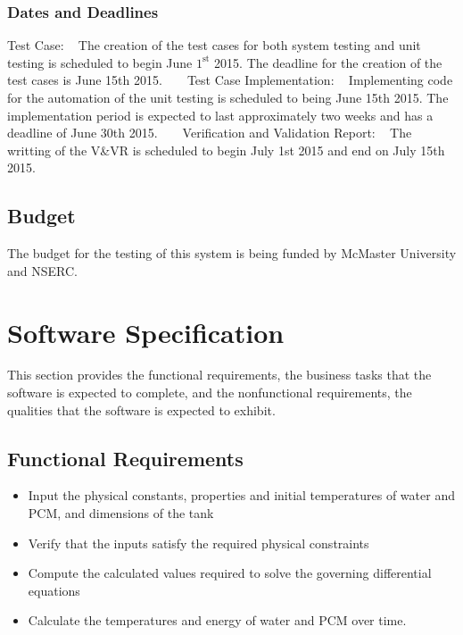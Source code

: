 \documentclass[12pt]{article}
\begin{document}
\subsubsection{Dates and Deadlines}
Test Case:
~\newline
The creation of the test cases for both system testing and unit testing is 
scheduled to begin June $1^\text{st}$ 2015.
The deadline for the creation of the test cases is June 15th 2015. 
~\newline
~\newline
Test Case Implementation:
~\newline
Implementing code for the automation of the unit testing is scheduled to being 
June 15th 2015. The implementation period
is expected to last approximately two weeks and has a deadline of June 30th 2015.
~\newline
~\newline
Verification and Validation Report:
~\newline
The writting of the V\&VR is scheduled to begin July 1st 2015 and end on July 15th 2015. 

\subsection{Budget}
The budget for the testing of this system is being funded by McMaster University and NSERC.

%
%

\section{ Software Specification}
This section provides the functional requirements, the business tasks that the
software is expected to complete, and the nonfunctional requirements, the
qualities that the software is expected to exhibit.

\subsection{Functional Requirements}

\noindent
\begin{itemize}
\item Input the physical constants, properties and initial temperatures of water
 and PCM, and dimensions of the tank  
\item Verify that the inputs satisfy the required physical constraints 
\item Compute the calculated values required to solve the governing differential equations
\item Calculate the temperatures and energy of water and PCM over time.
\end{itemize} 
\end{document}

